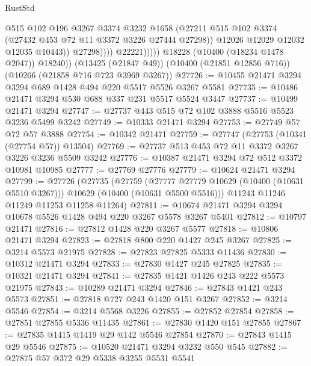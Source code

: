 \begin{lexlean}{RustStd}
\begin{coremodule}
                              @515
                              @102
                              @196
                              @3267
                              @3374
                              @3232
                              @1658
                              (@27211
                                @515
                                @102
                                @3374
                                (@27432 @453 @72 @11 @3372 @3226 @27444 @27298))
                              @12026
                              @12029
                              @12032
                              @12035
                              @10443))
                          @27298))))
                  @22221)))))
        @18228
        (@10400 (@18234 @1478 @2047))
        @18240))
    (@13425 (@21847 @49))
    (@10400 (@21851 @12856 @716))
    (@10266 (@21858 @716 @723 @3969 @3267))
@27726 := @10455 @21471 @3294 @3294 @689 @1428 @494 @220 @5517 @5526 @3267 @5581
@27735 := @10486 @21471 @3294 @530 @688 @337 @231 @5517 @5524 @3447
@27737 := @10499 @21471 @3294
@27747 := @27737 @443 @515 @72 @102 @3888 @5516 @5523 @3236 @5499 @3242
@27749 := @10333 @21471 @3294
@27753 := @27749 @57 @72 @57 @3888
@27754 := @10342 @21471
@27759 := @27747 (@27753 (@10341 (@27754 @57)) @13504)
@27769 := @27737 @513 @453 @72 @11 @3372 @3267 @3226 @3236 @5509 @3242
@27776 := @10387 @21471 @3294 @72 @512 @3372 @10981 @10985
@27777 := @27769 @27776
@27779 := @10624 @21471 @3294
@27799 := @27726
    (@27735
      (@27759
        (@27777 @27779 @10629 (@10400 (@10631 @5510 @3267)))
        @10629
        (@10400 (@10631 @5500 @5516)))
      @11243
      @11246
      @11249
      @11253
      @11258
      @11264)
@27811 := @10674 @21471 @3294 @3294 @10678 @5526 @1428 @494 @220 @3267 @5578 @3267 @5401
@27812 := @10797 @21471
@27816 := @27812 @1428 @220 @3267 @5577
@27818 := @10806 @21471 @3294
@27823 := @27818 @800 @220 @1427 @245 @3267
@27825 := @3214 @5573 @21975
@27828 := @27823 @27825 @5333 @11436
@27830 := @10312 @21471 @3294
@27833 := @27830 @1427 @245 @27825
@27835 := @10321 @21471 @3294
@27841 := @27835 @1421 @1426 @243 @222 @5573 @21975
@27843 := @10289 @21471 @3294
@27846 := @27843 @1421 @243 @5573
@27851 := @27818 @727 @243 @1420 @151 @3267
@27852 := @3214 @5546
@27854 := @3214 @5568 @3226
@27855 := @27852 @27854
@27858 := @27851 @27855 @5336 @11435
@27861 := @27830 @1420 @151 @27855
@27867 := @27835 @1415 @1419 @29 @142 @5546 @27854
@27870 := @27843 @1415 @29 @5546
@27875 := @10520 @21471 @3294 @3232 @550 @545
@27882 := @27875 @57 @372 @29 @5338 @3255 @5531 @5541

\end{coremodule}
\end{lexlean}
